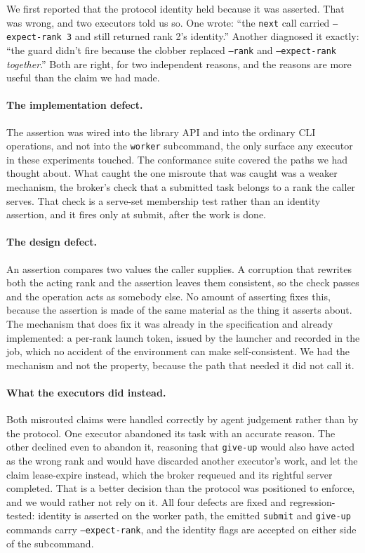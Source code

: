 \documentclass[sigconf,nonacm]{acmart}
\newcommand{\code}[1]{\texttt{\small #1}}
\begin{document}
We first reported that the protocol identity held because it was asserted. That
was wrong, and two executors told us so. One wrote: ``the \code{next} call
carried \code{--expect-rank 3} and still returned rank 2's identity.'' Another
diagnosed it exactly: ``the guard didn't fire because the clobber replaced
\code{--rank} and \code{--expect-rank} \emph{together}.'' Both are right, for
two independent reasons, and the reasons are more useful than the claim we had
made.

\paragraph{The implementation defect.} The assertion was wired into the library
API and into the ordinary CLI operations, and not into the \code{worker}
subcommand, the only surface any executor in these experiments touched. The
conformance suite covered the paths we had thought about. What caught the one
misroute that was caught was a weaker mechanism, the broker's check that a
submitted task belongs to a rank the caller serves. That check is a serve-set
membership test rather than an identity assertion, and it fires only at submit,
after the work is done.

\paragraph{The design defect.} An assertion compares two values the caller
supplies. A corruption that rewrites both the acting rank and the assertion
leaves them consistent, so the check passes and the operation acts as somebody
else. No amount of asserting fixes this, because the assertion is made of the
same material as the thing it asserts about. The mechanism that does fix it was
already in the specification and already implemented: a per-rank launch token,
issued by the launcher and recorded in the job, which no accident of the
environment can make self-consistent. We had the mechanism and not the property,
because the path that needed it did not call it.

\paragraph{What the executors did instead.} Both misrouted claims were handled
correctly by agent judgement rather than by the protocol. One executor abandoned
its task with an accurate reason. The other declined even to abandon it,
reasoning that \code{give-up} would also have acted as the wrong rank and would
have discarded another executor's work, and let the claim lease-expire instead,
which the broker requeued and its rightful server completed. That is a better
decision than the protocol was positioned to enforce, and we would rather not
rely on it. All four defects are fixed and regression-tested: identity is
asserted on the worker path, the emitted \code{submit} and \code{give-up}
commands carry \code{--expect-rank}, and the identity flags are accepted on
either side of the subcommand.
\end{document}
